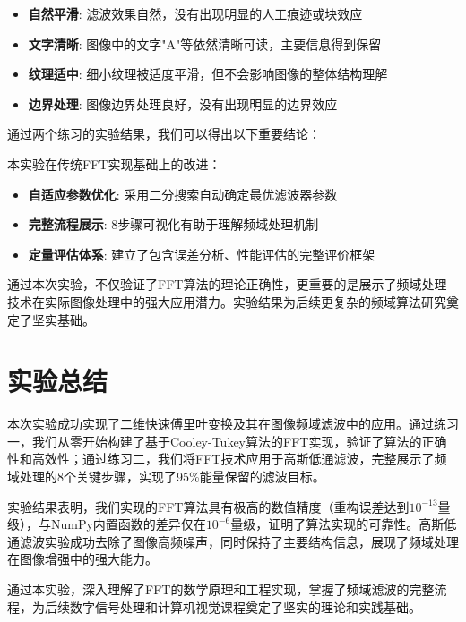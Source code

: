 \documentclass[a4paper]{article}
\begin{document}
\begin{itemize}
    \item \textbf{自然平滑}: 滤波效果自然，没有出现明显的人工痕迹或块效应
    \item \textbf{文字清晰}: 图像中的文字"A"等依然清晰可读，主要信息得到保留
    \item \textbf{纹理适中}: 细小纹理被适度平滑，但不会影响图像的整体结构理解
    \item \textbf{边界处理}: 图像边界处理良好，没有出现明显的边界效应
\end{itemize}




通过两个练习的实验结果，我们可以得出以下重要结论：



本实验在传统FFT实现基础上的改进：

\begin{itemize}
    \item \textbf{自适应参数优化}: 采用二分搜索自动确定最优滤波器参数
    \item \textbf{完整流程展示}: 8步骤可视化有助于理解频域处理机制
    \item \textbf{定量评估体系}: 建立了包含误差分析、性能评估的完整评价框架
\end{itemize}

通过本次实验，不仅验证了FFT算法的理论正确性，更重要的是展示了频域处理技术在实际图像处理中的强大应用潜力。实验结果为后续更复杂的频域算法研究奠定了坚实基础。

\section{实验总结}

本次实验成功实现了二维快速傅里叶变换及其在图像频域滤波中的应用。通过练习一，我们从零开始构建了基于Cooley-Tukey算法的FFT实现，验证了算法的正确性和高效性；通过练习二，我们将FFT技术应用于高斯低通滤波，完整展示了频域处理的8个关键步骤，实现了95\%能量保留的滤波目标。

实验结果表明，我们实现的FFT算法具有极高的数值精度（重构误差达到$10^{-13}$量级），与NumPy内置函数的差异仅在$10^{-6}$量级，证明了算法实现的可靠性。高斯低通滤波实验成功去除了图像高频噪声，同时保持了主要结构信息，展现了频域处理在图像增强中的强大能力。

通过本实验，深入理解了FFT的数学原理和工程实现，掌握了频域滤波的完整流程，为后续数字信号处理和计算机视觉课程奠定了坚实的理论和实践基础。
\end{document}
